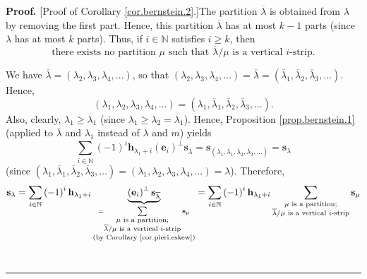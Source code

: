 \documentclass[numbers=enddot,12pt,final,onecolumn,notitlepage]{scrartcl}%
\theoremstyle{definition}
\newenvironment{proof}[1][Proof]{\noindent\textbf{#1.} }{\ \rule{0.5em}{0.5em}}
\let\sumnonlimits\sum
\renewcommand{\sum}{\sumnonlimits\limits}
\begin{document}
\begin{proof}
[Proof of Corollary \ref{cor.bernstein.2}.]The partition $\overline{\lambda}$
is obtained from $\lambda$ by removing the first part. Hence, this partition
$\overline{\lambda}$ has at most $k-1$ parts (since $\lambda$ has at most $k$
parts). Thus, if $i\in\mathbb{N}$ satisfies $i\geq k$, then%
\begin{equation}
\text{there exists no partition }\mu\text{ such that }\overline{\lambda}%
/\mu\text{ is a vertical }i\text{-strip.} \label{pf.cor.bernstein.2.bound}%
\end{equation}


We have $\overline{\lambda}=\left(  \lambda_{2},\lambda_{3},\lambda_{4}%
,\ldots\right)  $, so that $\left(  \lambda_{2},\lambda_{3},\lambda_{4}%
,\ldots\right)  =\overline{\lambda}=\left(  \overline{\lambda}_{1}%
,\overline{\lambda}_{2},\overline{\lambda}_{3},\ldots\right)  $. Hence,%
\[
\left(  \lambda_{1},\lambda_{2},\lambda_{3},\lambda_{4},\ldots\right)
=\left(  \lambda_{1},\overline{\lambda}_{1},\overline{\lambda}_{2}%
,\overline{\lambda}_{3},\ldots\right)  .
\]
Also, clearly, $\lambda_{1}\geq\overline{\lambda}_{1}$ (since $\lambda_{1}%
\geq\lambda_{2}=\overline{\lambda}_{1}$). Hence, Proposition
\ref{prop.bernstein.1} (applied to $\overline{\lambda}$ and $\lambda_{1}$
instead of $\lambda$ and $m$) yields%
\[
\sum_{i\in\mathbb{N}}\left(  -1\right)  ^{i}\mathbf{h}_{\lambda_{1}+i}\left(
\mathbf{e}_{i}\right)  ^{\perp}\mathbf{s}_{\overline{\lambda}}=\mathbf{s}%
_{\left(  \lambda_{1},\overline{\lambda}_{1},\overline{\lambda}_{2}%
,\overline{\lambda}_{3},\ldots\right)  }=\mathbf{s}_{\lambda}%
\]
(since $\left(  \lambda_{1},\overline{\lambda}_{1},\overline{\lambda}%
_{2},\overline{\lambda}_{3},\ldots\right)  =\left(  \lambda_{1},\lambda
_{2},\lambda_{3},\lambda_{4},\ldots\right)  =\lambda$). Therefore,%
\begin{align*}
\mathbf{s}_{\lambda}  &  =\sum_{i\in\mathbb{N}}\left(  -1\right)
^{i}\mathbf{h}_{\lambda_{1}+i}\underbrace{\left(  \mathbf{e}_{i}\right)
^{\perp}\mathbf{s}_{\overline{\lambda}}}_{\substack{=\sum_{\substack{\mu\text{
is a partition;}\\\overline{\lambda}/\mu\text{ is a vertical }i\text{-strip}%
}}\mathbf{s}_{\mu}\\\text{(by Corollary \ref{cor.pieri.eskew})}}}=\sum
_{i\in\mathbb{N}}\left(  -1\right)  ^{i}\mathbf{h}_{\lambda_{1}+i}%
\sum_{\substack{\mu\text{ is a partition;}\\\overline{\lambda}/\mu\text{ is a
vertical }i\text{-strip}}}\mathbf{s}_{\mu}\\

\end{align*}
\end{proof}
\end{document}

